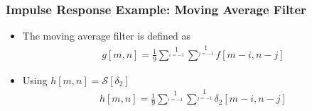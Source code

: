\documentclass[letterpaper,12pt]{article}
\begin{document}
\subsubsection{Impulse Response Example: Moving Average Filter}
\begin{itemize}
 \item The moving average filter is defined as
       \begin{align}
        g[m,n] = \frac{1}{9} \sum\limits^1\limits_{i=-1} \sum\limits^1\limits_{j=-1} f[m-i, n-j]
       \end{align}
 \item Using $h[m,n] = \mathcal{S}[\delta_2]$
       \begin{align}
        h[m,n] = \frac{1}{9} \sum\limits^1\limits_{i=-1} \sum\limits^1\limits_{j=-1} \delta_2[m-i, n-j]
       \end{align}
\end{itemize}
\end{document}
